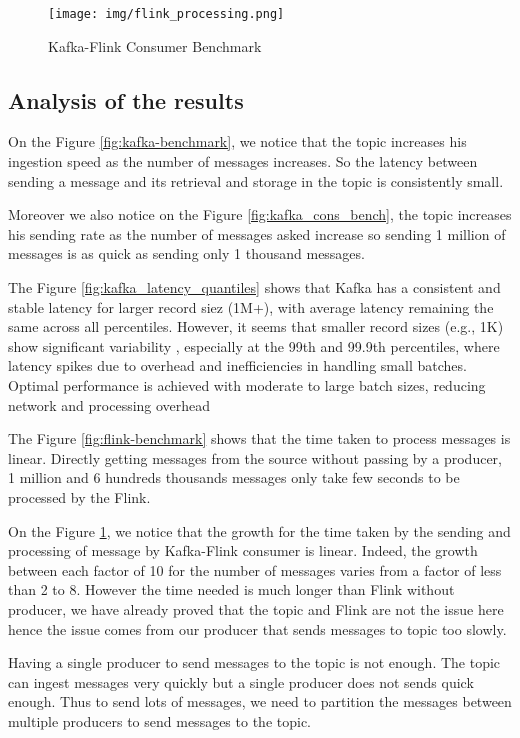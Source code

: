 \documentclass[utf8,9pt]{extarticle}
\begin{document}
\begin{figure}[H]
    \centering
    \texttt{[image: img/flink\_processing.png]}
    \caption{Kafka-Flink Consumer Benchmark}
    \label{fig:flink_processing}
\end{figure}



\subsection{Analysis of the results}
\hspace{2mm} On the Figure \ref{fig:kafka-benchmark}, we notice that the topic increases his ingestion speed as the number of messages increases. So the latency between sending a message and its retrieval and storage in the topic is consistently small.

Moreover we also notice on the Figure \ref{fig:kafka_cons_bench}, the topic increases his sending rate as the number of messages asked increase so sending 1 million of messages is as quick as sending only 1 thousand messages.

The Figure \ref{fig:kafka_latency_quantiles} shows that Kafka has a consistent and stable latency for larger record siez (1M+), with average latency remaining the same across all percentiles. However, it seems that smaller record sizes (e.g., 1K) show significant variability , especially at the 99th and 99.9th percentiles, where latency spikes due to overhead and inefficiencies in handling small batches. Optimal performance is achieved with moderate to large batch sizes, reducing network and processing overhead

The Figure \ref{fig:flink-benchmark} shows that the time taken to process messages is linear. Directly getting messages from the source without passing by a producer, 1 million and 6 hundreds thousands messages only take few seconds to be processed by the Flink.

On the Figure \ref{fig:flink_processing}, we notice that the growth for the time taken by the sending and processing of message by Kafka-Flink consumer is linear. Indeed, the growth between each factor of 10 for the number of messages varies from a factor of less than 2 to 8. However the time needed is much longer than Flink without producer, we have already proved that the topic and Flink are not the issue here hence the issue comes from our producer that sends messages to topic too slowly.

Having a single producer to send messages to the topic is not enough. The topic can ingest messages very quickly but a single producer does not sends quick enough. Thus to send lots of messages, we need to partition the messages between multiple producers to send messages to the topic.
\end{document}
